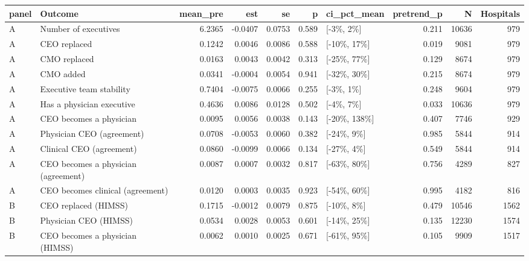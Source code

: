 
\begin{tabular}{llrrrrlrrr}
\toprule
panel & Outcome & mean\_pre & est & se & p & ci\_pct\_mean & pretrend\_p & N & Hospitals\\
\midrule
A & Number of executives & 6.2365 & -0.0407 & 0.0753 & 0.589 & {}[-3\%, 2\%] & 0.211 & 10636 & 979\\
A & CEO replaced & 0.1242 & 0.0046 & 0.0086 & 0.588 & {}[-10\%, 17\%] & 0.019 & 9081 & 979\\
A & CMO replaced & 0.0163 & 0.0043 & 0.0042 & 0.313 & {}[-25\%, 77\%] & 0.129 & 8674 & 979\\
A & CMO added & 0.0341 & -0.0004 & 0.0054 & 0.941 & {}[-32\%, 30\%] & 0.215 & 8674 & 979\\
A & Executive team stability & 0.7404 & -0.0075 & 0.0066 & 0.255 & {}[-3\%, 1\%] & 0.248 & 9604 & 979\\
\addlinespace
A & Has a physician executive & 0.4636 & 0.0086 & 0.0128 & 0.502 & {}[-4\%, 7\%] & 0.033 & 10636 & 979\\
A & CEO becomes a physician & 0.0095 & 0.0056 & 0.0038 & 0.143 & {}[-20\%, 138\%] & 0.407 & 7746 & 929\\
A & Physician CEO (agreement) & 0.0708 & -0.0053 & 0.0060 & 0.382 & {}[-24\%, 9\%] & 0.985 & 5844 & 914\\
A & Clinical CEO (agreement) & 0.0860 & -0.0099 & 0.0066 & 0.134 & {}[-27\%, 4\%] & 0.549 & 5844 & 914\\
A & CEO becomes a physician (agreement) & 0.0087 & 0.0007 & 0.0032 & 0.817 & {}[-63\%, 80\%] & 0.756 & 4289 & 827\\
\addlinespace
A & CEO becomes clinical (agreement) & 0.0120 & 0.0003 & 0.0035 & 0.923 & {}[-54\%, 60\%] & 0.995 & 4182 & 816\\
B & CEO replaced (HIMSS) & 0.1715 & -0.0012 & 0.0079 & 0.875 & {}[-10\%, 8\%] & 0.479 & 10546 & 1562\\
B & Physician CEO (HIMSS) & 0.0534 & 0.0028 & 0.0053 & 0.601 & {}[-14\%, 25\%] & 0.135 & 12230 & 1574\\
B & CEO becomes a physician (HIMSS) & 0.0062 & 0.0010 & 0.0025 & 0.671 & {}[-61\%, 95\%] & 0.105 & 9909 & 1517\\
\bottomrule
\end{tabular}
